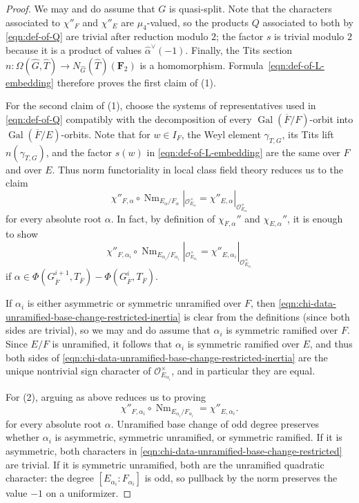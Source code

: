 \documentclass[reqno]{amsart}
\numberwithin{equation}{subsection}
\newcommand{\F}{\mathbf{F}}
\newcommand{\Gal}{\operatorname{Gal}}
\newcommand{\ol}[1]{\overline{#1}}
\newcommand{\wh}[1]{\widehat{#1}}
\newcommand{\co}{\colon}
\newcommand\cO{\mathcal{O}}
\DeclareMathOperator{\Nm}{Nm}
\theoremstyle{remark}
\numberwithin{equation}{subsection}
\numberwithin{figure}{subsection}
\begin{document}
\begin{proof}
We may and do assume that $G$ is quasi-split. Note that the characters associated to $\chi''_F$ and $\chi''_E$ are $\mu_4$-valued, so the products $Q$ associated to both by \eqref{eqn:def-of-Q} are trivial after reduction modulo $2$; the factor $s$ is trivial modulo $2$ because it is a product of values $\wh\alpha^\vee(-1)$. Finally, the Tits section $n\co \Omega(\wh G,\wh T)\to N_{\wh G}(\wh T)(\F_2)$ is a homomorphism.  Formula~\eqref{eqn:def-of-L-embedding} therefore proves the first claim of (1).

For the second claim of (1), choose the systems of representatives used in \eqref{eqn:def-of-Q} compatibly with the decomposition of every $\Gal(\ol F/F)$-orbit into $\Gal(\ol F/E)$-orbits. Note that for $w \in I_F$, the Weyl element $\gamma_{T,G}$, its Tits lift $n(\gamma_{T,G})$, and the factor $s(w)$ in \eqref{eqn:def-of-L-embedding} are the same over $F$ and over $E$. Thus norm functoriality in local class field theory reduces us to the claim
\[
    \chi''_{F,\alpha}\circ \Nm_{E_\alpha/F_\alpha}|_{\cO_{E_\alpha}^\times}
    =\chi''_{E,\alpha}|_{\cO_{E_\alpha}^\times}
\]
for every absolute root $\alpha$. In fact, by definition of $\chi_{F,\alpha}''$ and $\chi_{E,\alpha}''$, it is enough to show
\begin{equation}\label{eqn:chi-data-unramified-base-change-restricted-inertia}
    \chi''_{F,\alpha_i}\circ \Nm_{E_{\alpha_i}/F_{\alpha_i}}|_{\cO_{E_{\alpha_i}}^\times}
    =\chi''_{E,\alpha_i}|_{\cO_{E_{\alpha_i}}^\times}
\end{equation}
if $\alpha \in \Phi(G^{i+1}_{\ol F}, T_{\ol F}) - \Phi(G^i_{\ol F}, T_{\ol F})$.

If $\alpha_i$ is either asymmetric or symmetric unramified over $F$, then \eqref{eqn:chi-data-unramified-base-change-restricted-inertia} is clear from the definitions (since both sides are trivial), so we may and do assume that $\alpha_i$ is symmetric ramified over $F$. Since $E/F$ is unramified, it follows that $\alpha_i$ is symmetric ramified over $E$, and thus both sides of \eqref{eqn:chi-data-unramified-base-change-restricted-inertia} are the unique nontrivial sign character of $\cO_{E_{\alpha_i}}^\times$, and in particular they are equal.

For (2), arguing as above reduces us to proving
\begin{equation}\label{eqn:chi-data-unramified-base-change-restricted}
    \chi''_{F,\alpha_i}\circ \Nm_{E_{\alpha_i}/F_{\alpha_i}}
    =\chi''_{E,\alpha_i}.
\end{equation}
for every absolute root $\alpha$. Unramified base change of odd degree preserves whether $\alpha_i$ is asymmetric, symmetric unramified, or symmetric ramified.  If it is asymmetric, both characters in \eqref{eqn:chi-data-unramified-base-change-restricted} are trivial.  If it is symmetric unramified, both are the unramified quadratic character: the degree $[E_{\alpha_i}:F_{\alpha_i}]$ is odd, so pullback by the norm preserves the value $-1$ on a uniformizer.


\end{proof}
\end{document}
